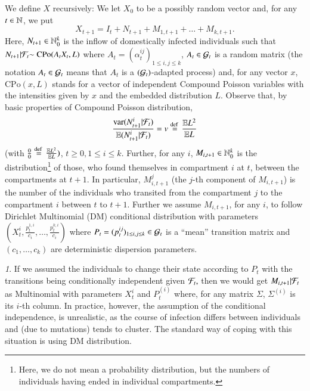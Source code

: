 \documentclass[english]{elsarticle}
\theoremstyle{plain}
\theoremstyle{remark}
\newtheorem{rem}[thm]{\protect\remarkname}
\theoremstyle{plain}
\theoremstyle{definition}
\providecommand{\remarkname}{Remark}
\begin{document}
We define $X$ recursively: We let $X_{0}$ to be a possibly random
vector and, for any $t\in\mathbb{N}$, we put 
\[
X_{t+1}=I_{t}+N_{t+1}+M_{1,t+1}+\dots+M_{k,t+1}.
\]
Here, $N_{t+1}\in\mathbb{N}_{0}^{k}$ is the inflow of domestically infected
individuals such that $N_{t+1}|\mathcal{F}_{t}\text{\ensuremath{\sim\mathrm{C\mathrm{Po}}(A_{t}X_{t},L)}}$
where $A_{t}=(\alpha_{t}^{ij})_{1\leq i,j\leq k}$, $A_{t}\in\mathcal{G}_{t}$
is a random matrix (the notation $A_{t}\in\mathcal{G}_{t}$ means that $A_{t}$
is a $(\mathcal{G}_{t})$-adapted process) and, for any vector $x$, $\mathrm{CPo}(x,L)$
stands for a vector of independent Compound Poisson variables with
the intensities given by $x$ and the embedded distribution $L$.
Observe that, by basic properties of Compound Poisson distribution,
\[
\frac{\mathrm{var}(N_{t+1}^{i}|\mathcal{F}_{t})}{\mathbb{E}(N_{t+1}^{i}|\mathcal{F}_{t})}=v\stackrel{\text{def }}{=}\frac{\mathbb{E} L^{2}}{\mathbb{E} L}
\]
 (with $\frac{0}{0}\stackrel{\text{def }}{=}\frac{\mathbb{E} L^{2}}{\mathbb{E} L})$, $t\geq0,1\leq i\leq k$.
Further, for any $i$, $M_{i,t+1}\in\mathbb{N}_{0}^{k}$ is the distribution\footnote{Here, we do not mean a probability distribution, but the numbers of
individuals having ended in individual compartments.} of those, who found themselves in compartment $i$ at $t$, between
the compartments at $t+1$. In particular, $M_{i,t+1}^{j}$ (the $j$-th
component of $M_{i,t+1}$) is the number of the individuals who transited
from the compartment $j$ to the compartment $i$ between $t$ to
$t+1$. Further we assume $M_{i,t+1}$, for any $i$, to follow Dirichlet
Multinomial (DM) conditional distribution with parameters $\left(X_{t}^{i},\frac{p_{t}^{1,i}}{c_{i}},\dots,\frac{p_{t}^{k,i}}{c_{i}}\right)$
where $P_{t}=(p_{t}^{ij})_{1\leq i,j\leq k}\in\mathcal{G}_{t}$ is a ``mean''
transition matrix and $(c_{1},\dots,c_{k})$ are deterministic dispersion
parameters. 
\begin{rem}
If we assumed the individuals to change their state according to $P_{t}$
with the transitions being conditionally independent given $\mathcal{F}_{t},$
then we would get $M_{i,t+1}|\mathcal{F}_{t}$ as Multinomial with parameters
$X_{t}^{i}$ and $P_{t}^{(i)}$ where, for any matrix $\Sigma$, $\Sigma^{(i)}$
is its $i$-th column. In practice, however, the assumption of the
conditional independence, is unrealistic, as the course of infection
differs between individuals and (due to mutations) tends to cluster.
The standard way of coping with this situation is using $\mathrm{DM}$
distribution. 
\end{rem}
\end{document}
